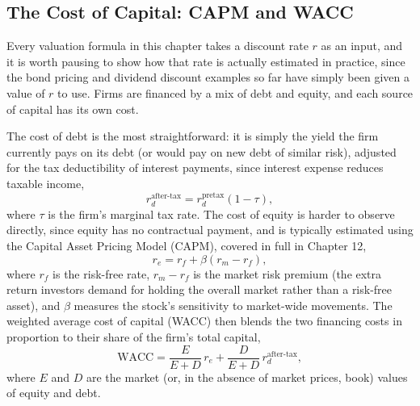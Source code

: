 \documentclass[../ai_in_finance]{subfiles}
\begin{document}
\subsection{The Cost of Capital: CAPM and WACC}
\label{sec:wacc}

Every valuation formula in this chapter takes a discount rate $r$ as an input, and it is worth pausing to show how that rate is actually estimated in practice, since the bond pricing and dividend discount examples so far have simply been given a value of $r$ to use. Firms are financed by a mix of debt and equity, and each source of capital has its own cost.

The cost of debt is the most straightforward: it is simply the yield the firm currently pays on its debt (or would pay on new debt of similar risk), adjusted for the tax deductibility of interest payments, since interest expense reduces taxable income,
\begin{equation*}
r_d^{\text{after-tax}} = r_d^{\text{pretax}} (1 - \tau),
\end{equation*}
where $\tau$ is the firm's marginal tax rate. The cost of equity is harder to observe directly, since equity has no contractual payment, and is typically estimated using the Capital Asset Pricing Model (CAPM), covered in full in Chapter 12,
\begin{equation*}
r_e = r_f + \beta (r_m - r_f),
\end{equation*}
where $r_f$ is the risk-free rate, $r_m - r_f$ is the market risk premium (the extra return investors demand for holding the overall market rather than a risk-free asset), and $\beta$ measures the stock's sensitivity to market-wide movements. The weighted average cost of capital (WACC) then blends the two financing costs in proportion to their share of the firm's total capital,
\begin{equation*}
\text{WACC} = \frac{E}{E+D}\, r_e + \frac{D}{E+D}\, r_d^{\text{after-tax}},
\end{equation*}
where $E$ and $D$ are the market (or, in the absence of market prices, book) values of equity and debt.
\end{document}
